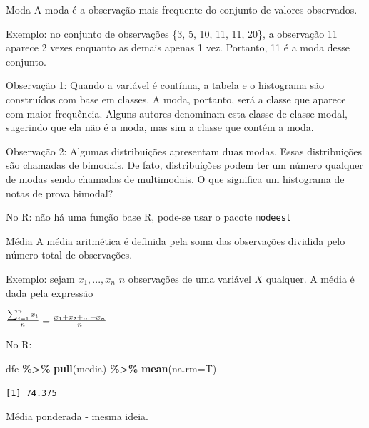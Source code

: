 \documentclass[
  9pt,
  ignorenonframetext,
  aspectratio=169]{beamer}
\newenvironment{Shaded}{\begin{snugshade}}{\end{snugshade}}
\newcommand{\DataTypeTok}[1]{\textcolor[rgb]{0.13,0.29,0.53}{#1}}
\newcommand{\KeywordTok}[1]{\textcolor[rgb]{0.13,0.29,0.53}{\textbf{#1}}}
\newcommand{\NormalTok}[1]{#1}
\newcommand{\OperatorTok}[1]{\textcolor[rgb]{0.81,0.36,0.00}{\textbf{#1}}}
\newcommand{\StringTok}[1]{\textcolor[rgb]{0.31,0.60,0.02}{#1}}
\begin{document}
\begin{frame}[fragile]{Moda}
\protect\hypertarget{moda}{}
A moda é a observação mais frequente do conjunto de valores observados.

Exemplo: no conjunto de observações \{3, 5, 10, 11, 11, 20\}, a
observação 11 aparece 2 vezes enquanto as demais apenas 1 vez. Portanto,
11 é a moda desse conjunto.

\scriptsize

Observação 1: Quando a variável é contínua, a tabela e o histograma são
construídos com base em classes. A moda, portanto, será a classe que
aparece com maior frequência. Alguns autores denominam esta classe de
classe modal, sugerindo que ela não é a moda, mas sim a classe que
contém a moda.

Observação 2: Algumas distribuições apresentam duas modas. Essas
distribuições são chamadas de bimodais. De fato, distribuições podem ter
um número qualquer de modas sendo chamadas de multimodais. O que
significa um histograma de notas de prova bimodal?

\small

No R: não há uma função base R, pode-se usar o pacote \texttt{modeest}
\end{frame}

\begin{frame}[fragile]{Média}
\protect\hypertarget{muxe9dia}{}
A média aritmética é definida pela soma das observações dividida pelo
número total de observações.

Exemplo: sejam \(x_1, ..., x_n\) \(n\) observações de uma variável \(X\)
qualquer. A média é dada pela expressão

\(\Large \frac{\sum_{i=1}^{n}x_i}{n} = \frac{x_1 + x_2 + ... + x_n}{n}\)

No R:

\begin{Shaded}
\begin{Highlighting}[]
\NormalTok{dfe }\OperatorTok{\%\textgreater{}\%}
\StringTok{  }\KeywordTok{pull}\NormalTok{(media) }\OperatorTok{\%\textgreater{}\%}
\StringTok{  }\KeywordTok{mean}\NormalTok{(}\DataTypeTok{na.rm=}\NormalTok{T)}
\end{Highlighting}
\end{Shaded}

\begin{verbatim}
[1] 74.375
\end{verbatim}

Média ponderada - mesma ideia.
\end{frame}
\end{document}
